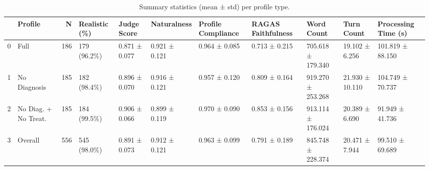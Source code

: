 \begin{table}
\caption{Summary statistics (mean ± std) per profile type.}
\label{tab:summary}
\begin{tabular}{llrllllllll}
\toprule
 & Profile & N & Realistic (\%) & Judge Score & Naturalness & Profile Compliance & RAGAS Faithfulness & Word Count & Turn Count & Processing Time (s) \\
\midrule
0 & Full & 186 & 179 (96.2\%) & 0.871 ± 0.077 & 0.921 ± 0.121 & 0.964 ± 0.085 & 0.713 ± 0.215 & 705.618 ± 179.340 & 19.102 ± 6.256 & 101.819 ± 88.150 \\
1 & No Diagnosis & 185 & 182 (98.4\%) & 0.896 ± 0.070 & 0.916 ± 0.121 & 0.957 ± 0.120 & 0.809 ± 0.164 & 919.270 ± 253.268 & 21.930 ± 10.110 & 104.749 ± 70.737 \\
2 & No Diag. + No Treat. & 185 & 184 (99.5\%) & 0.906 ± 0.066 & 0.899 ± 0.119 & 0.970 ± 0.090 & 0.853 ± 0.156 & 913.114 ± 176.024 & 20.389 ± 6.690 & 91.949 ± 41.736 \\
3 & Overall & 556 & 545 (98.0\%) & 0.891 ± 0.073 & 0.912 ± 0.121 & 0.963 ± 0.099 & 0.791 ± 0.189 & 845.748 ± 228.374 & 20.471 ± 7.944 & 99.510 ± 69.689 \\
\bottomrule
\end{tabular}
\end{table}
